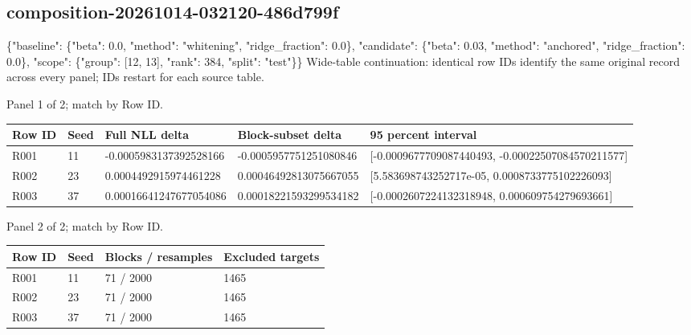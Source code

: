 \documentclass[10pt]{article}
\begin{document}
\subsection{composition-20261014-032120-486d799f}
\{"baseline": \{"beta": 0.0, "method": "whitening", "ridge\_fraction": 0.0\}, "candidate": \{"beta": 0.03, "method": "anchored", "ridge\_fraction": 0.0\}, "scope": \{"group": [12, 13], "rank": 384, "split": "test"\}\}
Wide-table continuation: identical row IDs identify the same original record across every panel; IDs restart for each source table.
\par\noindent Panel 1 of 2; match by Row ID.
{\scriptsize\setlength{\tabcolsep}{2pt}
\begin{longtable}{p{}p{}p{}p{}p{}}
Row ID & Seed & Full NLL delta & Block-subset delta & 95 percent interval \\
\hline\endhead
R001 & 11 & -0.0005983137392528166 & -0.0005957751251080846 & [-0.0009677709087440493, -0.00022507084570211577] \\
R002 & 23 & 0.0004492915974461228 & 0.00046492813075667055 & [5.583698743252717e-05, 0.0008733775102226093] \\
R003 & 37 & 0.00016641247677054086 & 0.00018221593299534182 & [-0.0002607224132318948, 0.000609754279693661] \\
\end{longtable}}
\par\noindent Panel 2 of 2; match by Row ID.
{\scriptsize\setlength{\tabcolsep}{2pt}
\begin{longtable}{p{}p{}p{}p{}}
Row ID & Seed & Blocks / resamples & Excluded targets \\
\hline\endhead
R001 & 11 & 71 / 2000 & 1465 \\
R002 & 23 & 71 / 2000 & 1465 \\
R003 & 37 & 71 / 2000 & 1465 \\
\end{longtable}}
\end{document}

